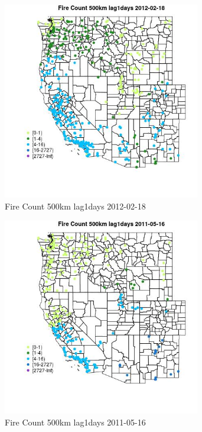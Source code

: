 \begin{figure} 
\centering  
\includegraphics[width=0.77\textwidth]{Code_Outputs/Report_ML_input_PM25_Step4_part_f_de_duplicated_aveswNAs_MapObsFire_Count_500km_lag1days2012-02-18.jpg} 
\caption{\label{fig:Report_ML_input_PM25_Step4_part_f_de_duplicated_aveswNAsMapObsFire_Count_500km_lag1days2012-02-18}Fire Count 500km lag1days 2012-02-18} 
\end{figure} 
 

\begin{figure} 
\centering  
\includegraphics[width=0.77\textwidth]{Code_Outputs/Report_ML_input_PM25_Step4_part_f_de_duplicated_aveswNAs_MapObsFire_Count_500km_lag1days2011-05-16.jpg} 
\caption{\label{fig:Report_ML_input_PM25_Step4_part_f_de_duplicated_aveswNAsMapObsFire_Count_500km_lag1days2011-05-16}Fire Count 500km lag1days 2011-05-16} 
\end{figure} 
 

